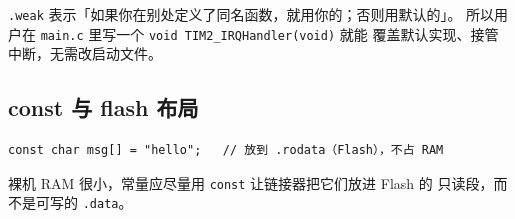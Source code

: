 \texttt{.weak} 表示「如果你在别处定义了同名函数，就用你的；否则用默认的」。
所以用户在 \texttt{main.c} 里写一个 \texttt{void TIM2\_IRQHandler(void)} 就能
覆盖默认实现、接管中断，无需改启动文件。

\subsection{const 与 flash 布局}

\begin{lstlisting}[style=code]
const char msg[] = "hello";   // 放到 .rodata（Flash），不占 RAM
\end{lstlisting}

裸机 RAM 很小，常量应尽量用 \texttt{const} 让链接器把它们放进 Flash 的
只读段，而不是可写的 \texttt{.data}。
